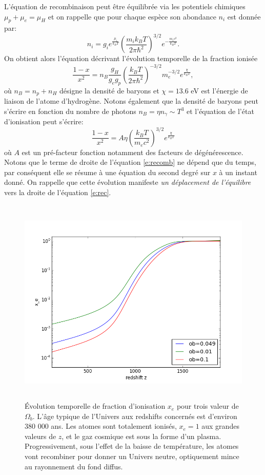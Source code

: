 L'équation de recombinaison peut être équilibrée via les potentiels chimiques $\mu_p+ \mu_e =\mu_H$ et on rappelle que pour chaque espèce son abondance $n_i$ est donnée par:
\begin{equation}
n_i=g_ie^{\frac{\mu_i}{k_BT}}\left(\frac{m_i k_B T}{2\pi\hbar^2}\right)^{3/2}e^{-\frac{m_i c^2}{k_B T}}.
\end{equation}
On obtient alors l'équation décrivant l'évolution temporelle de la fraction ionisée 
\begin{equation}
\frac{1-x}{x^2}=n_B \frac{g_H}{g_e g_p} \left(\frac{k_B T}{2\pi\hbar^2}\right)^{-3/2} m_e^{-3/2} e^{\frac{\chi}{k_B T}},
\end{equation}
où $n_B=n_p + n_H$ désigne la densité de baryons et $\chi=13.6$ eV est l'énergie de liaison de l'atome d'hydrogène. Notons également que la densité de baryons peut s'écrire en fonction du nombre de photons $n_B=\eta n_\gamma\sim T^3$ et l'équation de l'état d'ionisation peut s'écrire:
\begin{equation}
\frac{1-x}{x^2}=A \eta \left(\frac{k_B T}{m_e c^2}\right)^{3/2}e^{\frac{\chi}{k_B T}}
\label{e:recomb}
\end{equation}
où $A$ est un pré-facteur fonction notamment des facteurs de dégénérescence. Notons que le terme de droite de l'équation \ref{e:recomb} ne dépend que du temps, par conséquent elle se résume à une équation du second degré sur $x$ à un instant donné. On rappelle que cette évolution manifeste \textit{un déplacement de l'équilibre} vers  la droite de l'équation \ref{e:rec}.
\begin{figure}[htbp]
	\centering
		\includegraphics[height=10cm]{figs/recom.png}
		\caption{Évolution temporelle de fraction d'ionisation $x_e$ pour trois valeur de $\Omega_b$. L'âge typique de l'Univers aux redshifts concernés est d'environ 380 000 ans. Les atomes sont totalement ionisés, $x_e=1$ aux grandes valeurs de $z$, et le gaz cosmique est sous la forme d'un plasma. Progressivement, sous l'effet de la baisse de température, les atomes vont recombiner pour donner un Univers neutre, optiquement mince au rayonnement du fond diffus.}
	\label{f:recomb}
\end{figure}

